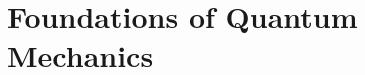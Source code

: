 \documentclass[a4paper]{scrartcl}
\begin{document}











\section{Foundations of Quantum Mechanics}
\end{document}
